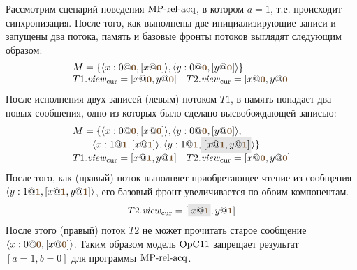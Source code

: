 Рассмотрим сценарий поведения ${\rm MP\text{-}rel\text{-}acq}$, в котором $a = 1$, т.е. происходит синхронизация.
После того, как выполнены две инициализирующие записи и запущены два потока, память и базовые фронты потоков
выглядят следующим образом:
\[
\begin{array}{l}
M = \{\angled{x:0@\tstamp{0}, [x@\tstamp{0}]}, \angled{y:0@\tstamp{0},[y@\tstamp{0}]} \} \\
T1.\Rcur = [x@\tstamp{0}, y@\tstamp{0}] \quad T2.\Rcur = [x@\tstamp{0}, y@\tstamp{0}]
\end{array}
\]
После исполнения двух записей (левым) потоком $T1$, в память попадает два новых сообщения, одно из которых
было сделано высвобождающей записью:
\[
\begin{array}{l}
M = \{
\angled{x:0@\tstamp{0}, [x@\tstamp{0}]}, \angled{y:0@\tstamp{0},[y@\tstamp{0}]}, \\
\qquad \angled{x:1@\tstamp{1}, [x@\tstamp{1}]}, \angled{y:1@\tstamp{1},\graybox{[x@\tstamp{1},y@\tstamp{1}]}}
 \} \\
T1.\Rcur = [x@\tstamp{1}, y@\tstamp{1}] \quad T2.\Rcur = [x@\tstamp{0}, y@\tstamp{0}]
\end{array}
\]
После того, как (правый) поток выполняет приобретающее чтение из сообщения 
$\angled{y:1@\tstamp{1},[x@\tstamp{1},y@\tstamp{1}]}$, его базовый фронт увеличивается по обоим компонентам.
\[
\begin{array}{l}
T2.\Rcur = [\graybox{x@\tstamp{1}}, y@\tstamp{1}]
\end{array}
\]
После этого (правый) поток $T2$ не может прочитать старое сообщение $\angled{x:0@\tstamp{0}, [x@\tstamp{0}]}$.
Таким образом модель $\mathrm{OpC11}$ запрещает результат $[a = 1, b = 0]$ для программы ${\rm MP\text{-}rel\text{-}acq}$.


